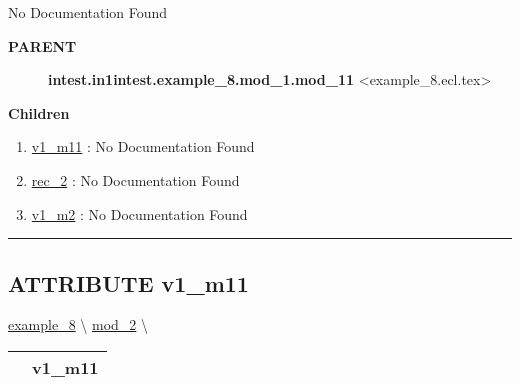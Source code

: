 \par





No Documentation Found










\par
\begin{description}
\item [\colorbox{tagtype}{\color{white} \textbf{\textsf{PARENT}}}] \textbf{intest.in1intest.example\_8.mod\_1.mod\_11} <example\_8.ecl.tex>
\end{description}


\textbf{Children}
\begin{enumerate}
\item \hyperlink{ecldoc:intest.in1intest.example_8.mod_1.mod_11.v1_m11}{v1\_m11}
: No Documentation Found
\item \hyperlink{ecldoc:intest.in1intest.example_8.mod_2.rec_2}{rec\_2}
: No Documentation Found
\item \hyperlink{ecldoc:intest.in1intest.example_8.mod_2.v1_m2}{v1\_m2}
: No Documentation Found
\end{enumerate}

\rule{\linewidth}{0.5pt}

\subsection*{\textsf{\colorbox{headtoc}{\color{white} ATTRIBUTE}
v1\_m11}}

\hypertarget{ecldoc:intest.in1intest.example_8.mod_1.mod_11.v1_m11}{}
\hspace{0pt} \hyperlink{ecldoc:intest.in1intest.example_8}{example_8} \textbackslash 
\hspace{0pt} \hyperlink{ecldoc:intest.in1intest.example_8.mod_2}{mod_2} \textbackslash 

{\renewcommand{\arraystretch}{1.5}
\begin{tabularx}{\textwidth}{|>{\raggedright\arraybackslash}l|X|}
\hline
\hspace{0pt}\mytexttt{\color{red} } & \textbf{v1\_m11} \\
\hline
\end{tabularx}
}

\par






